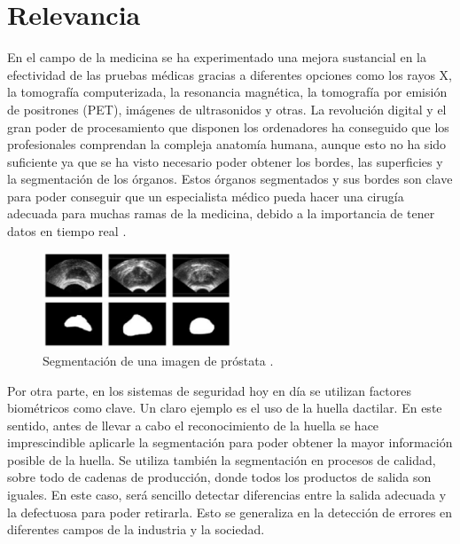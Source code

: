 \documentclass[main]{subfiles}
\begin{document}

\section{Relevancia}\label{sec:relevancia}

En el campo de la medicina \cite{lib:suri, lib:sonka} se ha experimentado una mejora sustancial en la efectividad de las pruebas médicas gracias a diferentes opciones como los rayos X, la tomografía computerizada, la resonancia magnética, la tomografía por emisión de positrones (PET), imágenes de ultrasonidos y otras. La revolución digital y el gran poder de procesamiento que disponen los ordenadores ha conseguido que los profesionales comprendan la compleja anatomía humana, aunque esto no ha sido suficiente ya que se ha visto necesario poder obtener los bordes, las superficies y la segmentación de los órganos. Estos órganos segmentados y sus bordes son clave para poder conseguir que un especialista médico pueda hacer una cirugía adecuada para muchas ramas de la medicina, debido a la importancia de tener datos en tiempo real \cite{url:noticiasegmentacion}. %
\begin{figure}
\centering
	\includegraphics[width=0.5\textwidth]{img/imagenmedica.eps}
	\caption{Segmentación de una imagen de próstata \cite{art:bustincesegmedica}.}
	\label{img:segmentacionmedica}
\end{figure}


Por otra parte, en los sistemas de seguridad hoy en día se utilizan factores biométricos como clave. Un claro ejemplo es el uso de la huella dactilar. En este sentido, antes de llevar a cabo el reconocimiento de la huella se hace imprescindible aplicarle la segmentación para poder obtener la mayor información posible de la huella. Se utiliza también la segmentación en procesos de calidad, sobre todo de cadenas de producción, donde todos los productos de salida son iguales. En este caso, será sencillo detectar diferencias entre la salida adecuada y la defectuosa para poder retirarla. Esto se generaliza en la detección de errores en diferentes campos de la industria y la sociedad.
\end{document}
